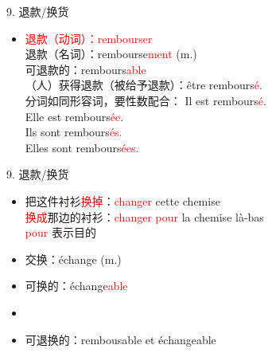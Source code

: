 \documentclass[french, aspectratio=169, 14pt, handout]{beamer}
\newcommand{\red}[1]{\textcolor{red}{#1}} %
\begin{document}
\begin{CJK*}{UTF8}{gkai}
\begin{frame}{9. 退款/换货}
\begin{itemize}
	\item \red{退款（动词）：rembourser} \pause \\
	退款（名词）：rembourse\red{ment} (m.) \pause \\
	可退款的：rembours\red{able} \pause \\
	（人）获得退款（被给予退款）：être rembours\red{é}.  \pause \\
	分词如同形容词，要性数配合：\hspace{0px} Il est rembours\red{é}.  \pause \\
	\hspace{200px} Elle est rembours\red{ée}.  \pause \\
	\hspace{200px} Ils sont rembours\red{és.}  \pause \\
	\hspace{190px} Elles sont rembours\red{ées.}
\end{itemize}
\end{frame}

\begin{frame}{9. 退款/换货}
\begin{itemize}
    \item %
	把这件衬衫\red{换掉}：\pause \red{changer} cette chemise \pause \\
	\red{换成}那边的衬衫：\pause \red{changer pour} la chemise là-bas \pause \\
	\hspace{160px} \red{pour} 表示目的 \pause \\
	\item 交换：échange (m.) \pause
	\item 可换的：échange\red{able} \pause
	\item[]
	\item 可退换的：\pause rembousable et échangeable
\end{itemize}
\end{frame}


\end{CJK*}
\end{document}
